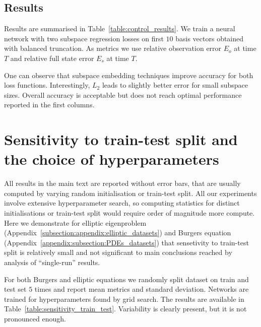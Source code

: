 \documentclass{article}
\begin{document}
\subsection{Results}
Results are summarised in Table~\ref{table:control_results}. We train a neural network with two subspace regression losses on first $10$ basis vectors obtained with balanced truncation. As metrics we use relative observation error $E_{o}$ at time $T$ and relative full state error $E_{s}$ at time $T$.

One can observe that subspace embedding techniques improve accuracy for both loss functions. Interestingly, $L_2$ leads to slightly better error for small subspace sizes. Overall accuracy is acceptable but does not reach optimal performance reported in the first columns.

\section{Sensitivity to train-test split and the choice of hyperparameters}
\label{appendix:sensetivity}
All results in the main text are reported without error bars, that are usually computed by varying random initialisation or train-test split. All our experiments involve extensive hyperparameter search, so computing statistics for distinct initialisations or train-test split would require order of magnitude more compute. Here we demonstrate for elliptic eigenproblem (Appendix~\ref{subsection:appendix:elliptic_datasets}) and Burgers equation (Appendix~\ref{appendix:subsection:PDEs_datasets}) that sensetivity to train-test split is relatively small and not significant to main conclusions reached by analysis of ``single-run'' results.

For both Burgers and elliptic equations we randomly split dataset on train and test set $5$ times and report mean metrics and standard deviation. Networks are trained for hyperparameters found by grid search. The results are available in Table~\ref{table:sensitivity_train_test}. Variability is clearly present, but it is not pronounced enough.
\end{document}
